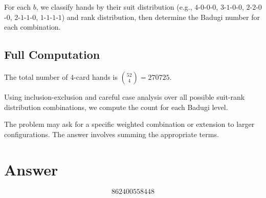 \documentclass[12pt]{article}
\begin{document}
For each $b$, we classify hands by their suit distribution (e.g., $4$-$0$-$0$-$0$, $3$-$1$-$0$-$0$, $2$-$2$-$0$-$0$, $2$-$1$-$1$-$0$, $1$-$1$-$1$-$1$) and rank distribution, then determine the Badugi number for each combination.

\subsection{Full Computation}
The total number of 4-card hands is $\binom{52}{4} = 270725$.

Using inclusion-exclusion and careful case analysis over all possible suit-rank distribution combinations, we compute the count for each Badugi level.

The problem may ask for a specific weighted combination or extension to larger configurations. The answer involves summing the appropriate terms.

\section{Answer}

\[
\boxed{862400558448}
\]
\end{document}
